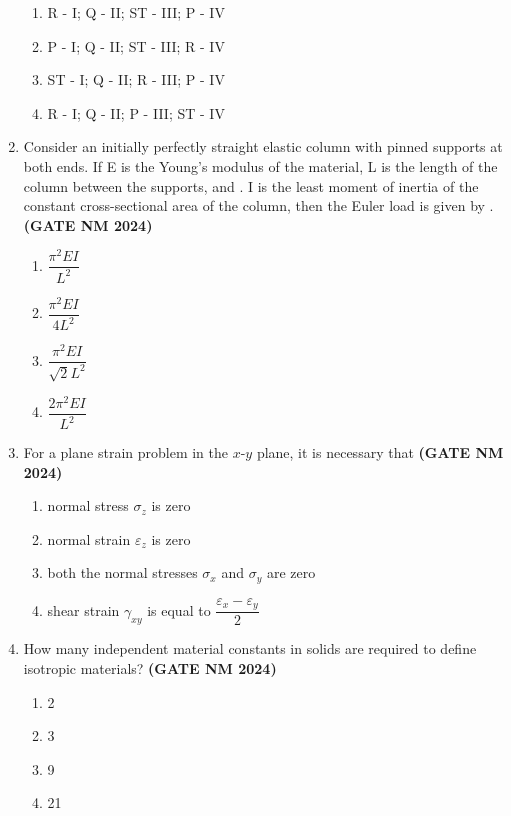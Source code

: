 \documentclass[journal,15pt,onecolumn]{IEEEtran}
\theoremstyle{remark}
\begin{document}
\begin{enumerate}
  \begin{enumerate}
    \item R - I; Q - II; ST - III; P - IV
    \item P - I; Q - II; ST - III; R - IV
    \item ST - I; Q - II; R - III; P - IV
    \item R - I; Q - II; P - III; ST - IV
  \end{enumerate}


  \item
  Consider an initially perfectly straight elastic column with pinned supports at both ends. If E is the Young’s modulus of the material, L is the length of the column between the supports, and . I is the least moment of inertia of the constant cross-sectional area of the column, then the Euler load is given by .\hfill \textbf{ (GATE NM 2024)}

  \begin{enumerate}
    \item $\dfrac{\pi^2 EI}{L^2}$
    \item $\dfrac{\pi^2 EI}{4L^2}$
    \item $\dfrac{\pi^2 EI}{\sqrt{2}L^2}$
    \item $\dfrac{2\pi^2 EI}{L^2}$
  \end{enumerate}

  \item For a plane strain problem in the $x$-$y$ plane, it is necessary that\hfill \textbf{ (GATE NM 2024)}

  \begin{enumerate}
    \item normal stress $\sigma_z$ is zero
    \item normal strain $\varepsilon_z$ is zero
    \item both the normal stresses $\sigma_x$ and $\sigma_y$ are zero
    \item shear strain $\gamma_{xy}$ is equal to $\dfrac{\varepsilon_x - \varepsilon_y}{2}$
  \end{enumerate}

 \item How many independent material constants in solids are required to define isotropic materials?\hfill \textbf{ (GATE NM 2024)}

  \begin{enumerate}
    \item 2
    \item 3
    \item 9
    \item 21
  \end{enumerate}




\end{enumerate}
\end{document}
